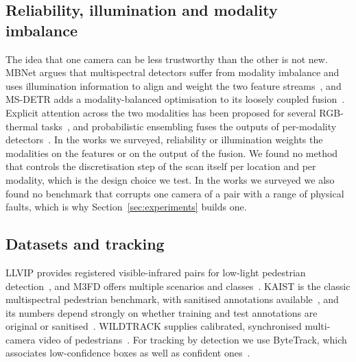 \subsection{Reliability, illumination and modality imbalance}
The idea that one camera can be less trustworthy than the other is not new. MBNet argues that multispectral detectors suffer from modality imbalance and uses illumination information to align and weight the two feature streams~\cite{zhou2020mbnet}, and MS-DETR adds a modality-balanced optimisation to its loosely coupled fusion~\cite{xing2024msdetr}. Explicit attention across the two modalities has been proposed for several RGB-thermal tasks~\cite{liang2023eaefnet}, and probabilistic ensembling fuses the outputs of per-modality detectors~\cite{chen2022proben}. In the works we surveyed, reliability or illumination weights the modalities on the features or on the output of the fusion. We found no method that controls the discretisation step of the scan itself per location and per modality, which is the design choice we test. In the works we surveyed we also found no benchmark that corrupts one camera of a pair with a range of physical faults, which is why Section~\ref{sec:experiments} builds one.

\subsection{Datasets and tracking}
LLVIP provides registered visible-infrared pairs for low-light pedestrian detection~\cite{jia2021llvip}, and M3FD offers multiple scenarios and classes~\cite{liu2022tardal}. KAIST is the classic multispectral pedestrian benchmark, with sanitised annotations available~\cite{li2018kaistsanitized}, and its numbers depend strongly on whether training and test annotations are original or sanitised~\cite{zhang2021gaff}. WILDTRACK supplies calibrated, synchronised multi-camera video of pedestrians~\cite{chavdarova2018wildtrack}. For tracking by detection we use ByteTrack, which associates low-confidence boxes as well as confident ones~\cite{zhang2022bytetrack}.
